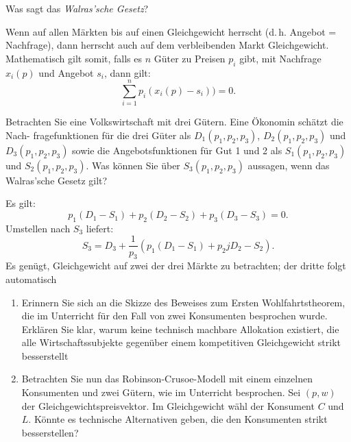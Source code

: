 \begin{question}
	Was sagt das \emph{Walras'sche Gesetz}?
\end{question}
\begin{solution}
	Wenn auf allen Märkten bis auf einen Gleichgewicht herrscht (d. h. Angebot = Nachfrage), dann herrscht auch auf dem verbleibenden Markt Gleichgewicht. Mathematisch gilt somit, falls es $n$ Güter zu Preisen $p_i$ gibt, mit Nachfrage $x_i(p)$ und Angebot $s_i$, dann gilt:
	\[
		\sum_{i=1}^{n} p_i (x_i(p)-s_i)) = 0
		.\]
\end{solution}


\begin{question}
	Betrachten Sie eine Volkswirtschaft mit drei Gütern. Eine Ökonomin schätzt die Nach-
	fragefunktionen für die drei Güter als $D_1(p_1, p_2, p_3)$, $D_2(p_1, p_2, p_3)$ und $D_3(p_1, p_2, p_3)$ sowie
	die Angebotsfunktionen für Gut 1 und 2 als $S_1(p_1, p_2, p_3)$ und $S_2(p_1, p_2, p_3)$. Was können
	Sie über $S_3(p_1, p_2, p_3)$ aussagen, wenn das Walras’sche Gesetz gilt?
\end{question}

\begin{solution}
	Es gilt:
	\[
		p_1 (D_1-S_1) + p_2 (D_2-S_2) + p_3(D_3-S_3) = 0
		.\]
	Umstellen nach $S_3$ liefert:
	\[
		S_3 = D_3 + \frac{1}{p_3} \left( p_1 (D_1-S_1) + p_2jD_2-S_2 \right)
		.\]
	Es genügt, Gleichgewicht auf zwei der drei Märkte zu betrachten; der dritte folgt automatisch
\end{solution}


\begin{question}[subtitle={Erstes Wohlfahrtstheorem}]
	\begin{enumerate}
		\item Erinnern Sie sich an die Skizze des Beweises zum Ersten Wohlfahrtstheorem, die im
		      Unterricht für den Fall von zwei Konsumenten besprochen wurde. Erklären Sie klar, warum
		      keine technisch machbare Allokation existiert, die alle Wirtschaftssubjekte gegenüber einem
		      kompetitiven Gleichgewicht strikt besserstellt
		\item  Betrachten Sie nun das Robinson-Crusoe-Modell mit einem einzelnen Konsumenten und
		      zwei Gütern, wie im Unterricht besprochen. Sei $(p,w)$ der Gleichgewichtspreisvektor. Im Gleichgewicht wähl der Konsument $C$ und $L$. Könnte es technische Alternativen geben, die den Konsumenten strikt besserstellen?
	\end{enumerate}
\end{question}

